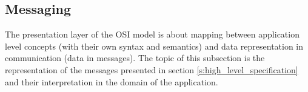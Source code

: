 \documentclass{article}
\begin{document}


  \subsection{Messaging}

   The presentation layer of the OSI model is about mapping between application
   level concepts (with their own syntax and semantics) and data representation
   in communication (data in messages). The topic of this subsection is the
   representation of the messages presented in section
   \ref{s:high_level_specification} and their interpretation in the domain of the
   application.


\end{document}
